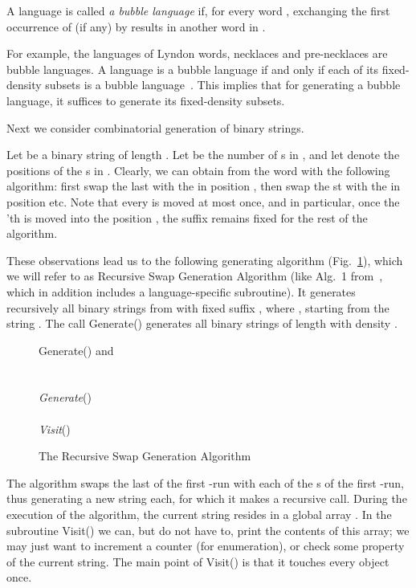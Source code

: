 \documentclass[11pt,a4paper]{llncs}
\begin{document}
\begin{definition}
A language  is called {\em a bubble language} if, for every word , exchanging the first occurrence of  (if any) by  results in another word in . 
\end{definition}



For example, the languages of Lyndon words, necklaces and pre-necklaces are bubble languages. 
A language  is a bubble language if and only if each of its fixed-density subsets  is a bubble language~\cite{RSW12}. This implies that for generating a bubble language, it suffices to generate its fixed-density subsets.

Next we consider combinatorial generation of binary strings.

Let  be a binary string of length . Let  be the number of s in , and let  denote the positions of the s in . 
Clearly, we can obtain  from the word  with the following algorithm: first swap the last  with the  in position , then swap the st  with the  in position  etc. Note that every  is moved at most once, and in particular, once the 'th  is moved into the position , the suffix  remains fixed for the rest of the algorithm. 

These observations lead us to the following generating algorithm (Fig.~\ref{algo:bubble}), which we will refer to as Recursive Swap Generation Algorithm (like Alg.\ 1 from~\cite{SW12}, which in addition includes a language-specific subroutine). It generates recursively all binary strings from  with fixed suffix , 
where , starting from the string . The call Generate() generates all binary strings of length  with density .  

\begin{figure}
\begin{algorithm}{Generate()}{
} 
\qif  and  \\ \qthen 
\qfor \\
\qdo 
 \\
{\em Generate}()\\

\qend
\qfi \\
{\em Visit}()
\end{algorithm}
\vspace{-4mm}
\caption{The Recursive Swap Generation Algorithm\label{algo:bubble}}
\end{figure}



The algorithm swaps the last  of the first -run with each of the s of the first -run, thus generating a new string each, for which it makes a recursive call. During the execution of the algorithm, the current string resides in a global array .  In the subroutine Visit() we can, but do not have to, print the contents of this array; we may just want to increment a counter (for enumeration), or check some property of the current string. The main point of Visit() is that it touches every object once. 
\end{document}
